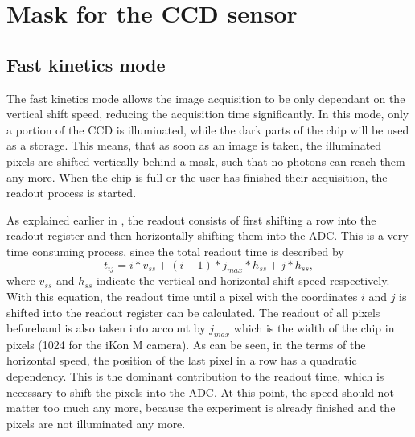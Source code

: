 
\newpage
\section{Mask for the CCD sensor}
\subsection{Fast kinetics mode}
\label{ch:fast_kin}
The fast kinetics mode allows the image acquisition to be only dependant on the vertical shift speed, reducing the acquisition time significantly. In this mode, only a portion of the CCD is illuminated, while the dark parts of the chip will be used as a storage. This means, that as soon as an image is taken, the illuminated pixels are shifted vertically behind a mask, such that no photons can reach them any more. When the chip is full or the user has finished their acquisition, the readout process is started.

As explained earlier in , the readout consists of first shifting a row into the readout register and then horizontally shifting them into the ADC. This is a very time consuming process, since the total readout time is described by
\begin{equation}
t_{ij} = i*v_{ss} + (i-1)*j_{max}*h_{ss}+j*h_{ss},
\end{equation}
where $v_{ss}$ and $h_{ss}$ indicate the vertical and horizontal shift speed respectively.
With this equation, the readout time until a pixel with the coordinates $i$ and $j$ is shifted into the readout register can be calculated. The readout of all pixels beforehand is also taken into account by $j_{max}$ which is the width of the chip in pixels (1024 for the iKon M camera).
As can be seen, in the terms of the horizontal speed, the position of the last pixel in a row has a quadratic dependency. This is the dominant contribution to the readout time, which is necessary to shift the pixels into the ADC. At this point, the speed should not matter too much any more, because the experiment is already finished and the pixels are not illuminated any more.

